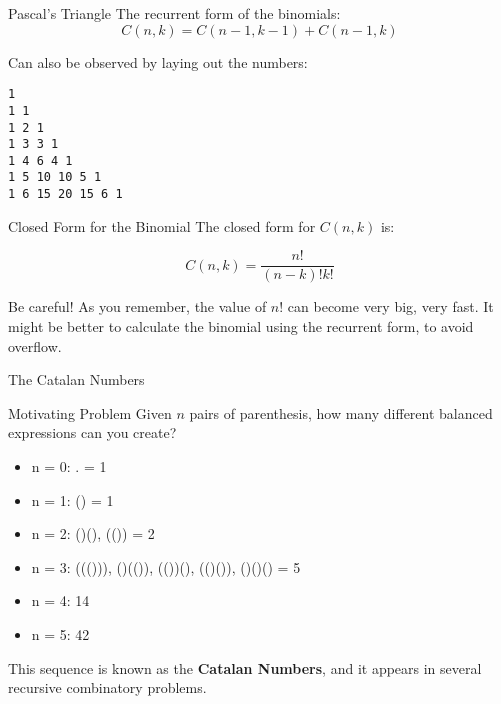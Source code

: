 \begin{frame}[fragile]{Pascal's Triangle}
  The recurrent form of the binomials:
  \begin{equation*}
    C(n,k) = C(n-1,k-1) + C(n-1,k)
  \end{equation*}

  Can also be observed by laying out the numbers:

\begin{verbatim}
1
1 1
1 2 1
1 3 3 1
1 4 6 4 1
1 5 10 10 5 1
1 6 15 20 15 6 1
\end{verbatim}
\end{frame}

\begin{frame}{Closed Form for the Binomial}
  The closed form for $C(n,k)$ is:\bigskip

    \begin{equation*}
      C(n,k) = \frac{n!}{(n-k)!k!}
    \end{equation*}\bigskip

  Be careful! As you remember, the value of $n!$ can become very big,
  very fast. It might be better to calculate the binomial using the recurrent
  form, to avoid overflow.
\end{frame}

\begin{frame}{The Catalan Numbers}
  \begin{block}{Motivating Problem}
    Given $n$ pairs of parenthesis, how many different balanced expressions can you create?\bigskip

    \begin{itemize}
      \item n = 0: . = 1
      \item n = 1: () = 1
      \item n = 2: ()(), (()) = 2
      \item n = 3: ((())), ()(()), (())(), (()()), ()()() = 5
      \item n = 4: 14
      \item n = 5: 42
    \end{itemize}
  \end{block}\bigskip

  This sequence is known as the {\bf Catalan Numbers}, and it appears in
  several recursive combinatory problems.
\end{frame}

